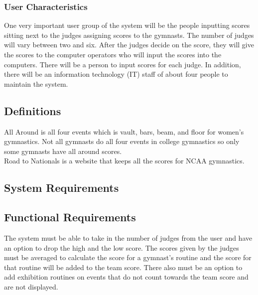 \documentclass[letterpaper,10pt,draftclsnofoot,onecolumn,]{article}
\begin{document}
\subsubsection{User Characteristics}
One very important user group of the system will be the people inputting scores sitting next to the judges assigning scores to the gymnasts. The number of judges will vary between two and six. After the judges decide on the score, they will give the scores to the computer operators who will input the scores into the computers. There will be a person to input scores for each judge. In addition, there will be an information technology (IT) staff of about four people to maintain the system.


\subsection{Definitions}
All Around is all four events which is vault, bars, beam, and floor for women's gymnastics. Not all gymnasts do all four events in college gymnastics so only some gymnasts have all around scores.\\

\noindent Road to Nationals is a website that keeps all the scores for NCAA gymnastics.


\begin{center}
\section{System Requirements}
\end{center}

\subsection{Functional Requirements}
The system must be able to take in the number of judges from the user and have an option to drop the high and the low score. The scores given by the judges must be averaged to calculate the score for a gymnast's routine and the score for that routine will be added to the team score. There also must be an option to add exhibition routines on events that do not count towards the team score and are not displayed.\\
\end{document}
